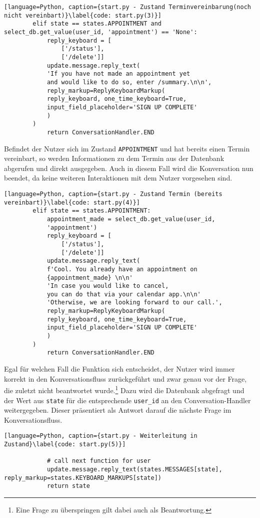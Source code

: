             \begin{lstlisting}[language=Python, caption={start.py - Zustand Terminvereinbarung(noch nicht vereinbart)}\label{code: start.py(3)}]
        elif state == states.APPOINTMENT and select_db.get_value(user_id, 'appointment') == 'None':
            reply_keyboard = [
                ['/status'], 
                ['/delete']]
            update.message.reply_text(
            'If you have not made an appointment yet 
            and would like to do so, enter /summary.\n\n',
            reply_markup=ReplyKeyboardMarkup(
            reply_keyboard, one_time_keyboard=True, 
            input_field_placeholder='SIGN UP COMPLETE'
            )
        )
            return ConversationHandler.END
            \end{lstlisting}

            Befindet der Nutzer sich im Zustand \verb|APPOINTMENT| und hat bereits einen Termin vereinbart, so werden Informationen zu dem Termin aus der Datenbank abgerufen und direkt ausgegeben. Auch in diesem Fall wird die Konversation nun beendet, da keine weiteren Interaktionen mit dem Nutzer vorgesehen sind.
            \begin{lstlisting}[language=Python, caption={start.py - Zustand Termin (bereits vereinbart)}\label{code: start.py(4)}]
        elif state == states.APPOINTMENT:
            appointment_made = select_db.get_value(user_id, 
            'appointment')
            reply_keyboard = [
                ['/status'], 
                ['/delete']]
            update.message.reply_text(
            f'Cool. You already have an appointment on 
            {appointment_made} \n\n'
            'In case you would like to cancel, 
            you can do that via your calendar app.\n\n'
            'Otherwise, we are looking forward to our call.',
            reply_markup=ReplyKeyboardMarkup(
            reply_keyboard, one_time_keyboard=True, 
            input_field_placeholder='SIGN UP COMPLETE'
            )
        )
            return ConversationHandler.END
            \end{lstlisting}
            Egal für welchen Fall die Funktion sich entscheidet, der Nutzer wird immer korrekt in den Konversationsfluss zurückgeführt und zwar genau vor der Frage, die zuletzt nicht beantwortet wurde.\footnote{Eine Frage zu überspringen gilt dabei auch als Beantwortung.} Dazu wird die Datenbank abgefragt und der Wert aus \verb|state| für die entsprechende \verb|user_id| an den Conversation-Handler weitergegeben. Dieser präsentiert als Antwort darauf die nächste Frage im Konversationsfluss. \\
            \begin{lstlisting}[language=Python, caption={start.py - Weiterleitung in Zustand}\label{code: start.py(5)}]

            # call next function for user
            update.message.reply_text(states.MESSAGES[state], reply_markup=states.KEYBOARD_MARKUPS[state])
            return state
            \end{lstlisting}

